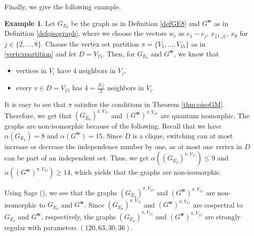 \documentclass[11pt]{article}
\theoremstyle{definition}
\newtheorem{exam}[theo]{Example}
\numberwithin{equation}{section}
\begin{document}
Finally, we give the following example. 

\begin{exam}
Let $G_{E_8}$ be the graph as in Definition \ref{defGE8} and $G^{\boldsymbol{w}}$ as in Definition \ref{defqisograph}, where we choose the vectors $w_i$ as $e_1-e_j$, $x_{\{1,j\}}$, $x_{\emptyset}$ for $j \in \{2,\dots, 8\}$. Choose the vertex set partition $\pi=\{V_1, \dots, V_{15}\}$ as in \eqref{vertexpartition} and let $D=V_{15}$. Then, for $G_{E_8}$ and $G^{\boldsymbol{w}}$, we know that 
\begin{itemize}
    \item[(i)] vertices in $V_i$ have $4$ neighbors in $V_j$,
    \item[(ii)] every $v\in D=V_{15}$ has $4=\frac{|V_i|}{2}$ neighbors in $V_i$. 
\end{itemize}
It is easy to see that $\pi$ satisfies the conditions in Theorem \ref{thm:qisoGM}. Therefore, we get that $(G_{E_8})^{\pi, V_{15}}$ and $(G^{\boldsymbol{w}})^{\pi, V_{15}}$ are quantum isomorphic. The graphs are non-isomorphic because of the following. Recall that we have $\alpha(G_{E_8})=8$ and $\alpha(G^{\boldsymbol{w}})=15$. Since $D$ is a clique, switching can at most increase or decrease the independence number by one, as at most one vertex in $D$ can be part of an independent set. Thus, we get $\alpha((G_{E_8})^{\pi, V_{15}})\leq 9$ and $\alpha((G^{\boldsymbol{w}})^{\pi, V_{15}})\geq 14$, which yields that the graphs are non-isomorphic. 

Using Sage (\cite{sagemath}), we see that the graphs $(G_{E_8})^{\pi, V_{15}}$ and $(G^{\boldsymbol{w}})^{\pi, V_{15}}$ are non-isomorphic to $G_{E_8}$ and $G^{\boldsymbol{w}}$. Since $(G_{E_8})^{\pi, V_{15}}$ and $(G^{\boldsymbol{w}})^{\pi, V_{15}}$ are cospectral to $G_{E_8}$ and $G^{\boldsymbol{w}}$, respectively, the graphs $(G_{E_8})^{\pi, V_{15}}$ and $(G^{\boldsymbol{w}})^{\pi, V_{15}}$ are strongly regular with parameters $(120, 63, 30, 36)$. 
\end{exam}
\end{document}
